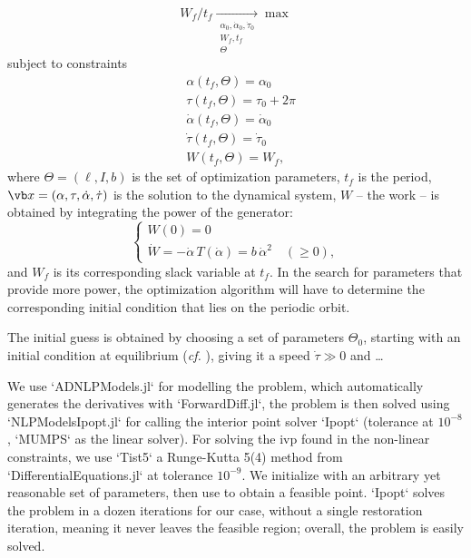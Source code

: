 \begin{equation}
W_f / t_f \underset{\substack{\alpha_0, \dot{\alpha}_0, \dot{\tau}_0 \\ W_f, t_f \\ \Theta}}{\longrightarrow} \max
\end{equation}
subject to constraints
\begin{equation}\begin{split}
    &\alpha(t_f, \Theta) = \alpha_0 \\
    &\tau(t_f, \Theta) = \tau_0 + 2\pi\\
    &\dot \alpha(t_f, \Theta) = \dot \alpha_0 \\
    &\dot \tau(t_f, \Theta) = \dot \tau_0 \\
    &W(t_f, \Theta) = W_f,
\end{split}
\end{equation}
where \(\Theta = (\ell, I, b)\) is the set of optimization parameters, \(t_f\) is the period, \(\vb x = (\alpha, \tau, \dot \alpha, \dot \tau)\) is the solution to the dynamical system, \(W\) -- the work -- is obtained by integrating the power of the generator:
\begin{equation}
\begin{cases}
    W(0) = 0 \\
    \dot W = - \dot \alpha \, T(\dot \alpha) = b \, \dot \alpha^2 \quad (\geq 0),
\end{cases}
\end{equation}
and \(W_f\) is its corresponding slack variable at \(t_f\). In the search for parameters that provide more power, the optimization algorithm will have to determine the corresponding initial condition that lies on the periodic orbit.

The initial guess is obtained by choosing a set of parameters \(\Theta_0\), starting with an initial condition at equilibrium (\emph{cf.} ), giving it a speed \(\dot \tau \gg 0\) and …

We use `ADNLPModels.jl`  for modelling the problem, which automatically generates the derivatives with `ForwardDiff.jl`, the problem is then solved using `NLPModelsIpopt.jl` for calling the interior point solver `Ipopt`  (tolerance at \(10^{-8}\), `MUMPS` as the linear solver). For solving the \ac{ivp} found in the non-linear constraints, we use `Tist5` a Runge-Kutta 5(4) method from `DifferentialEquations.jl`  at tolerance \(10^{-9}\).
We initialize with an arbitrary yet reasonable set of parameters, then use  to obtain a feasible  point. 
`Ipopt` solves the problem in a dozen iterations for our case, without a single restoration iteration, meaning it never leaves the feasible region; overall, the problem is easily solved.

